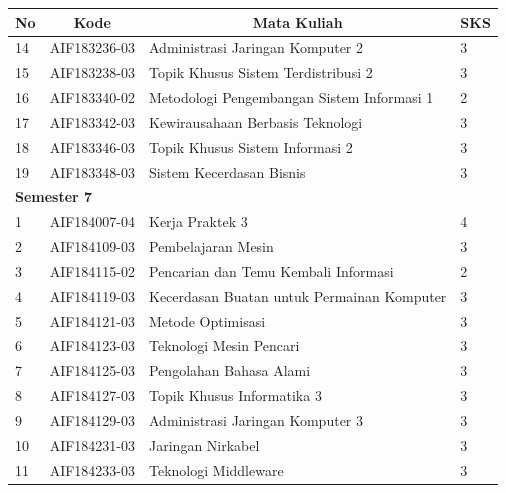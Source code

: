 \begin{table}[H]
	\centering
		\begin{tabular}{|p{0.5cm}|p{2.85cm}|p{4.95cm}|p{2.7cm}|}
			\hline
			\multicolumn{1}{|c|}{\textbf{No}} & \multicolumn{1}{c|}{\textbf{Kode}} & \multicolumn{1}{c|}{\textbf{Mata Kuliah}} & \multicolumn{1}{c|}{\textbf{SKS}} \\ \hline
14  & AIF183236-03    & Administrasi Jaringan Komputer 2           & 3   \\ \hline
15  & AIF183238-03    & Topik Khusus Sistem Terdistribusi 2        & 3   \\ \hline
16  & AIF183340-02    & Metodologi Pengembangan Sistem Informasi 1 & 2   \\ \hline
17  & AIF183342-03    & Kewirausahaan Berbasis Teknologi           & 3   \\ \hline
18 & AIF183346-03    & Topik Khusus Sistem Informasi 2            & 3   \\ \hline
19  & AIF183348-03    & Sistem Kecerdasan Bisnis                   & 3   \\ \hline
\multicolumn{4}{|l|}{\textbf{Semester 7}}                                \\ \hline
1   & AIF184007-04    & Kerja Praktek 3                            & 4   \\ \hline
2   & AIF184109-03    & Pembelajaran Mesin                         & 3   \\ \hline
3   & AIF184115-02    & Pencarian dan Temu Kembali Informasi       & 2   \\ \hline
4   & AIF184119-03    & Kecerdasan Buatan untuk Permainan Komputer & 3   \\ \hline
5   & AIF184121-03    & Metode Optimisasi                          & 3   \\ \hline
6   & AIF184123-03    & Teknologi Mesin Pencari                    & 3   \\ \hline
7   & AIF184125-03    & Pengolahan Bahasa Alami                    & 3   \\ \hline
8   & AIF184127-03    & Topik Khusus Informatika 3                 & 3   \\ \hline
9   & AIF184129-03    & Administrasi Jaringan Komputer 3           & 3   \\ \hline
			10  & AIF184231-03    & Jaringan Nirkabel                          & 3   \\ \hline
			11  & AIF184233-03    & Teknologi Middleware                       & 3   \\ \hline

\end{tabular}
\end{table}
